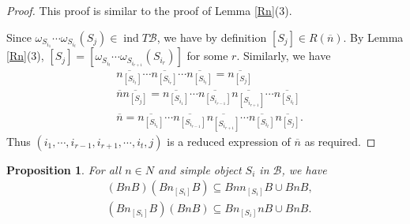 \documentclass[12pt]{amsart}
\newtheorem{proposition}[theorem]{Proposition}
\begin{document}
\begin{proof}
    This proof is similar to the proof of Lemma \ref{Rn}(3).
    
    Since $\omega_{S_{i_1}} \cdots \omega_{S_{i_{t}}}(S_j) \in \operatorname{ind}T\mathcal{B} $, we have by definition $[S_j] \in R(\overline{n})$.
    By Lemma \ref{Rn}(3), $[S_j] = [\omega_{S_{i_{t}}} \cdots \omega_{S_{i_{r+1}}}(S_{i_r})] $ for some $r$.
    Similarly, we have 
    \begin{align*}
        &\overline{n_{[S_{i_{t}}]}} \cdots  \overline{n_{[S_{i_{r}}]}} \cdots \overline{n_{[S_{i_{t}}]}}  = \overline{n_{[S_{j}]}} \\
        &\overline{n}\overline{n_{[S_j]}} = \overline{n_{[S_{i_1}]}} \cdots \overline{n_{[S_{i_{r-1}}]}} \overline{n_{[S_{i_{r+1}}]}}  \cdots \overline{n_{[S_{i_{t}}]}}\\
        &\overline{n} = \overline{n_{[S_{i_1}]}} \cdots \overline{n_{[S_{i_{r-1}}]}} \overline{n_{[S_{i_{r+1}}]}}  \cdots \overline{n_{[S_{i_{t}}]}} \overline{n_{[S_j]}}.
    \end{align*}
    Thus $(i_1,\cdots,i_{r-1},i_{r+1},\cdots,i_t,j)$ is a reduced expression of $\overline{n}$ as required.
\end{proof}

\begin{proposition}
    For all $n\in N$ and simple object $S_i$ in $\mathcal{B}$, we have 
    \begin{align*}
       & (BnB)(Bn_{[S_i]}B) \subseteq  Bnn_{[S_i]}B \cup BnB, \\
       & (Bn_{[S_i]}B)(BnB) \subseteq  Bn_{[S_i]}nB \cup BnB.
    \end{align*}
\end{proposition}
\end{document}

